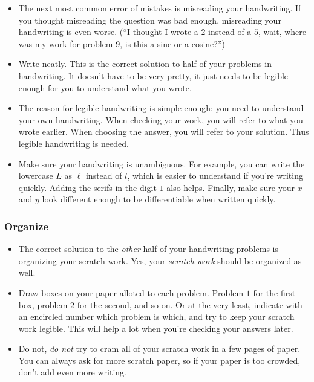 \documentclass[10pt,paper=letter]{scrartcl}
\begin{document}
\begin{itemize}

\item The next most common error of mistakes is misreading your handwriting. If you thought misreading the question was bad enough, misreading your handwriting is even worse. (``I thought I wrote a $2$ instead of a $5$, wait, where was my work for problem $9$, is this a sine or a cosine?'')

\item Write neatly. This is the correct solution to half of your problems in handwriting. It doesn't have to be very pretty, it just needs to be legible enough for you to understand what you wrote.

\item The reason for legible handwriting is simple enough: you need to understand your own handwriting. When checking your work, you will refer to what you wrote earlier. When choosing the answer, you will refer to your solution. Thus legible handwriting is needed.

\item Make sure your handwriting is unambiguous. For example, you can write the lowercase $L$ as $\ell$ instead of $l$, which is easier to understand if you're writing quickly. Adding the serifs in the digit $1$ also helps. Finally, make sure your $x$ and $y$ look different enough to be differentiable when written quickly.

\end{itemize}

\subsubsection*{Organize}

\begin{itemize}

\item The correct solution to the \emph{other} half of your handwriting problems is organizing your scratch work. Yes, your \emph{scratch work} should be organized as well.

\item Draw boxes on your paper alloted to each problem. Problem $1$ for the first box, problem $2$ for the second, and so on. Or at the very least, indicate with an encircled number which problem is which, and try to keep your scratch work legible. This will help a lot when you're checking your answers later.

\item Do not, \emph{do not} try to cram all of your scratch work in a few pages of paper. You can always ask for more scratch paper, so if your paper is too crowded, don't add even more writing.

\end{itemize}
\end{document}
